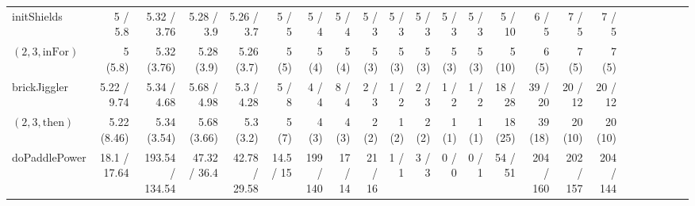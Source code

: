 \documentclass[sigconf]{acmart}
\newcommand{\thenBr}{\text{then}}
\newcommand{\elseBr}{\text{else}}
\newcommand{\inFor}{\text{inFor}}
\begin{document}
\begin{table*}
{\begin{tabular}{l|rrrr|rrrr|rrrr|rrrr|r|r|r|r|r|r}
    \midrule
    \midrule
    initShields       & 5 / 5.8 & 5.32 / 3.76 & 5.28 / 3.9 & 5.26 / 3.7 & 5 / 5 & 5 / 4 & 5 / 4 & 5 / 3 & 5 / 3 & 5 / 3 & 5 / 3 & 5 / 3 & 5 / 10 & 6 / 5 & 7 / 5 & 7 / 5 & & & & & & \\
    $(2,3,\inFor)$    & 5 (5.8) & 5.32 (3.76) & 5.28 (3.9) & 5.26 (3.7) & 5 (5) & 5 (4) & 5 (4) & 5 (3) & 5 (3) & 5 (3) & 5 (3) & 5 (3) & 5 (10) & 6 (5) & 7 (5) & 7 (5) & & & & & & \\
    \midrule
    \midrule
    brickJiggler      & 5.22 / 9.74 & 5.34 / 4.68 & 5.68 / 4.98 & 5.3 / 4.28 & 5 / 8 & 4 / 4 & 8 / 4 & 2 / 3 & 1 / 2 & 2 / 3 & 1 / 2 & 1 / 2 & 18 / 28 & 39 / 20 & 20 / 12 & 20 / 12 & & & & & &\\
    $(2,3,\thenBr)$   & 5.22 (8.46) & 5.34 (3.54) & 5.68 (3.66) & 5.3 (3.2)  & 5 (7) & 4 (3) & 4 (3) & 2 (2) & 1 (2) & 2 (2) & 1 (1) & 1 (1) & 18 (25) & 39 (18) & 20 (10) & 20 (10) & & & & & & \\
    \midrule
    doPaddlePower        & 18.1 / 17.64  & 193.54 / 134.54 & 47.32 / 36.4  & 42.78 / 29.58 & 14.5 / 15 & 199 / 140 & 17 / 14 & 21 / 16 & 1 / 1 & 3 / 3 & 0 / 0 & 0 / 1 & 54 / 51 & 204 / 160 & 202 / 157 & 204 / 144 & & & & & & \\

\end{tabular}}
\end{table*}
\end{document}
